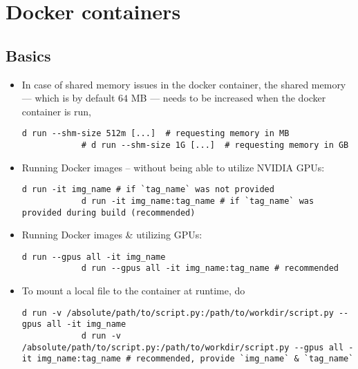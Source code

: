 \documentclass[12pt, a4paper]{scrbook}
\numberwithin{equation}{section}
\theoremstyle{definition}
\theoremstyle{definition}
\begin{document}
	\section{Docker containers}
	
	\subsection{Basics}
	
	\begin{itemize} 
		
		\item In case of shared memory issues in the docker container, the shared memory --- which is by default $64$ MB --- needs to be increased when the docker container is run,
		
		\begin{lstlisting}[style=mystylebash, label=alg:docker_run, xleftmargin=\parindent]
			d run --shm-size 512m [...]  # requesting memory in MB
			# d run --shm-size 1G [...]  # requesting memory in GB
		\end{lstlisting}
		
		\item Running Docker images -- without being able to utilize NVIDIA GPUs:
		
		\begin{lstlisting}[style=mystylebash, label=alg:docker_run, xleftmargin=\parindent]
			d run -it img_name # if `tag_name` was not provided
			d run -it img_name:tag_name # if `tag_name` was provided during build (recommended)
		\end{lstlisting}
		
		\item Running Docker images \& utilizing GPUs: 
		
		\begin{lstlisting}[style=mystylebash, label=alg:docker_run_gpus, xleftmargin=\parindent]
			d run --gpus all -it img_name 
			d run --gpus all -it img_name:tag_name # recommended
		\end{lstlisting}
		
		\item To mount a local file to the container at runtime, do
		
		\begin{lstlisting}[style=mystylebash, label=alg:docker__run_volume_mounting, xleftmargin=\parindent]
			d run -v /absolute/path/to/script.py:/path/to/workdir/script.py --gpus all -it img_name 
			d run -v /absolute/path/to/script.py:/path/to/workdir/script.py --gpus all -it img_name:tag_name # recommended, provide `img_name` & `tag_name`
		\end{lstlisting}
		

\end{itemize}
\end{document}
